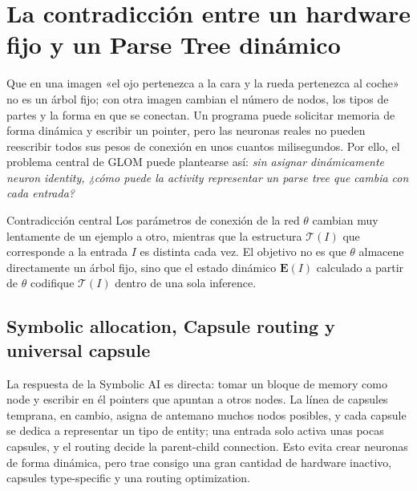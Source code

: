 \section{La contradicción entre un hardware fijo y un Parse Tree dinámico}

Que en una imagen «el ojo pertenezca a la cara y la rueda pertenezca al coche» no es un árbol fijo; con otra imagen cambian el número de nodos, los tipos de partes y la forma en que se conectan. Un programa puede solicitar memoria de forma dinámica y escribir un pointer, pero las neuronas reales no pueden reescribir todos sus pesos de conexión en unos cuantos milisegundos. Por ello, el problema central de GLOM puede plantearse así: \emph{sin asignar dinámicamente neuron identity, ¿cómo puede la activity representar un parse tree que cambia con cada entrada?}


\begin{importantbox}{Contradicción central}
Los parámetros de conexión de la red $\theta$ cambian muy lentamente de un ejemplo a otro, mientras que la estructura $\mathcal T(I)$ que corresponde a la entrada $I$ es distinta cada vez. El objetivo no es que $\theta$ almacene directamente un árbol fijo, sino que el estado dinámico $\mathbf E(I)$ calculado a partir de $\theta$ codifique $\mathcal T(I)$ dentro de una sola inference.
\end{importantbox}

\subsection{Symbolic allocation, Capsule routing y universal capsule}

La respuesta de la Symbolic AI es directa: tomar un bloque de memory como node y escribir en él pointers que apuntan a otros nodes. La línea de capsules temprana, en cambio, asigna de antemano muchos nodos posibles, y cada capsule se dedica a representar un tipo de entity; una entrada solo activa unas pocas capsules, y el routing decide la parent-child connection. Esto evita crear neuronas de forma dinámica, pero trae consigo una gran cantidad de hardware inactivo, capsules type-specific y una routing optimization.


